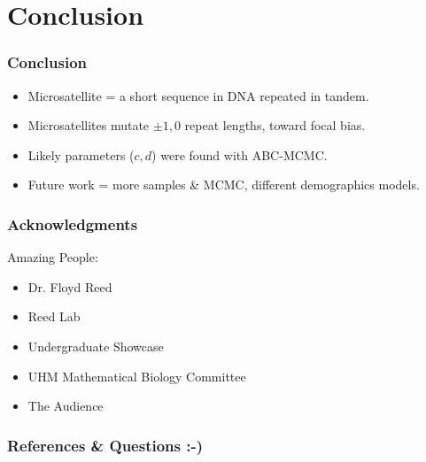 \documentclass[11pt]{beamer}
\begin{document}
    \section{Conclusion}\label{sec:c}
    \begin{frame}
        \frametitle{Conclusion}
        \begin{itemize}
            \item Microsatellite = a short sequence in DNA repeated in tandem.\medskip
            \item Microsatellites mutate $\pm 1,0$ repeat lengths, toward focal bias.\medskip
            \item Likely parameters ($c, d$) were found with ABC-MCMC.\medskip
            \item Future work = more samples \& MCMC, different demographics models.
        \end{itemize}

    \end{frame}

    \begin{frame}
        \frametitle{Acknowledgments}
        \begin{block}{Amazing People:}
            \begin{itemize}
                \item Dr. Floyd Reed \smallskip
                \item Reed Lab \smallskip
                \item Undergraduate Showcase \smallskip
                \item UHM Mathematical Biology Committee \smallskip
                \item The Audience
            \end{itemize}
        \end{block}
    \end{frame}

    \begin{frame}
        \frametitle{References \& Questions :-)}
        \tiny
        
        
    \end{frame}


\end{document}
